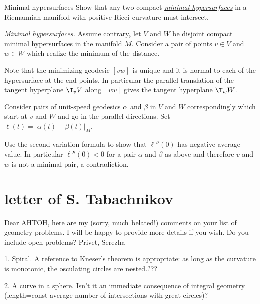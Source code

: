 \begin{pr}{}{Minimal hypersurfaces}\label{Minimal hypersurfaces}
Show that any two compact \hyperref[Minimal surface]{\emph{minimal hypersurfaces}} in a Riemannian manifold with positive Ricci curvature must intersect.
\end{pr}

\textit{Minimal hypersurfaces.}
Assume contrary, let $V$ and $W$ be disjoint compact minimal hypersurfaces in the manifold $M$.
Consider a pair of points $v\in V$ and $w\in W$ which realize the minimum of the distance.

Note that the minimizing geodesic $[vw]$ is unique and it is normal to each of the hypersurface at the end points.
In particular the parallel translation of the tangent hyperplane $\T_vV$ along $[vw]$ gives the tangent hyperplane $\T_wW$.

Consider pairs of unit-speed geodesics $\alpha$ and $\beta$ 
in $V$ and $W$ correspondingly 
which start at $v$ and $W$ and go in the parallel directions. 
Set $\ell(t)=|\alpha(t)-\beta(t)|_M$.

Use the second variation formula to show that $\ell''(0)$ has negative average value. 
In particular $\ell''(0)<0$ for a pair $\alpha$ and $\beta$ as above
and therefore  $v$ and $w$ is not a minimal pair, a contradiction.



















\chapter{letter of S. Tabachnikov}

Dear AHTOH, here are my (sorry, much belated!) comments on your list
of geometry problems. I will be happy to provide more details if you
wish. Do you include open problems? Privet, Serezha

1. Spiral. A reference to Kneser's theorem is appropriate: as long as
the curvature is monotonic, the osculating circles are nested.???

2. A curve in a sphere. Isn't it an immediate consequence of integral
geometry (length=const \times average number of intersections with
great circles)?


